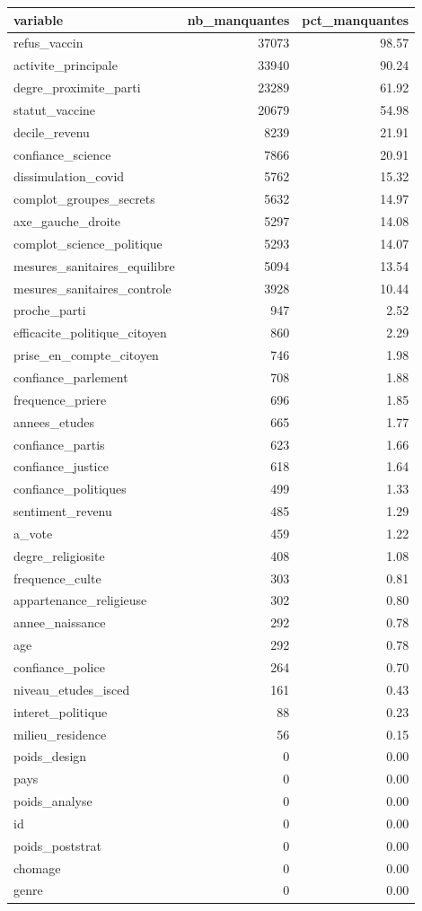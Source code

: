\begin{tabular}{lrr}
\toprule
variable & nb_manquantes & pct_manquantes \\
\midrule
refus_vaccin & 37073 & 98.57 \\
activite_principale & 33940 & 90.24 \\
degre_proximite_parti & 23289 & 61.92 \\
statut_vaccine & 20679 & 54.98 \\
decile_revenu & 8239 & 21.91 \\
confiance_science & 7866 & 20.91 \\
dissimulation_covid & 5762 & 15.32 \\
complot_groupes_secrets & 5632 & 14.97 \\
axe_gauche_droite & 5297 & 14.08 \\
complot_science_politique & 5293 & 14.07 \\
mesures_sanitaires_equilibre & 5094 & 13.54 \\
mesures_sanitaires_controle & 3928 & 10.44 \\
proche_parti & 947 & 2.52 \\
efficacite_politique_citoyen & 860 & 2.29 \\
prise_en_compte_citoyen & 746 & 1.98 \\
confiance_parlement & 708 & 1.88 \\
frequence_priere & 696 & 1.85 \\
annees_etudes & 665 & 1.77 \\
confiance_partis & 623 & 1.66 \\
confiance_justice & 618 & 1.64 \\
confiance_politiques & 499 & 1.33 \\
sentiment_revenu & 485 & 1.29 \\
a_vote & 459 & 1.22 \\
degre_religiosite & 408 & 1.08 \\
frequence_culte & 303 & 0.81 \\
appartenance_religieuse & 302 & 0.80 \\
annee_naissance & 292 & 0.78 \\
age & 292 & 0.78 \\
confiance_police & 264 & 0.70 \\
niveau_etudes_isced & 161 & 0.43 \\
interet_politique & 88 & 0.23 \\
milieu_residence & 56 & 0.15 \\
poids_design & 0 & 0.00 \\
pays & 0 & 0.00 \\
poids_analyse & 0 & 0.00 \\
id & 0 & 0.00 \\
poids_poststrat & 0 & 0.00 \\
chomage & 0 & 0.00 \\
genre & 0 & 0.00 \\
\bottomrule
\end{tabular}
